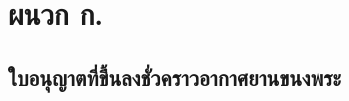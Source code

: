 
\chapter{ผนวก ก.}

\section{ใบอนุญาตที่ขึ้นลงชั่วคราวอากาศยานขนงพระ} \label{ใบอนุญาตที่ขึ้นลงชั่วคราวอากาศยานขนงพระ}

